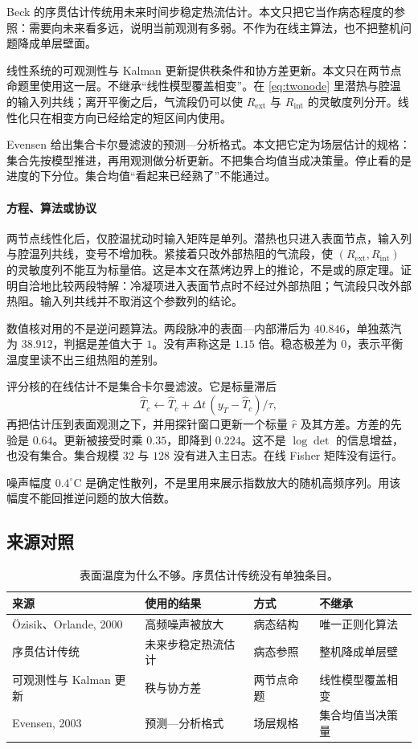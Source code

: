Beck 的序贯估计传统用未来时间步稳定热流估计。本文只把它当作病态程度的参照：需要向未来看多远，说明当前观测有多弱。不作为在线主算法，也不把整机问题降成单层壁面。

线性系统的可观测性与 Kalman 更新提供秩条件和协方差更新。本文只在两节点命题里使用这一层。不继承“线性模型覆盖相变”。在 \eqref{eq:twonode} 里潜热与腔温的输入列共线；离开平衡之后，气流段仍可以使 \(R_{\mathrm{ext}}\) 与 \(R_{\mathrm{int}}\) 的灵敏度列分开。线性化只在相变方向已经给定的短区间内使用。

Evensen 给出集合卡尔曼滤波的预测—分析格式\cite{evensen2003}。本文把它定为场层估计的规格：集合先按模型推进，再用观测做分析更新。不把集合均值当成决策量。停止看的是进度的下分位。集合均值“看起来已经熟了”不能通过。

\paragraph{方程、算法或协议}
两节点线性化后，仅腔温扰动时输入矩阵是单列。潜热也只进入表面节点，输入列与腔温列共线，变号不增加秩。紧接着只改外部热阻的气流段，使 $(R_{\mathrm{ext}},R_{\mathrm{int}})$ 的灵敏度列不能互为标量倍。这是本文在蒸烤边界上的推论，不是\cite{ozisik2000}或\cite{evensen2003}的原定理。证明自洽地比较两段特解：冷凝项进入表面节点时不经过外部热阻；气流段只改外部热阻。输入列共线并不取消这个参数列的结论。

数值核对用的不是逆问题算法。两段脉冲的表面—内部滞后为 $40.846$，单独蒸汽为 $38.912$，判据是差值大于 $1$。没有声称这是 $1.15$ 倍。稳态极差为 $0$，表示平衡温度里读不出三组热阻的差别。

评分核的在线估计不是集合卡尔曼滤波。它是标量滞后
\[
\widehat T_c\leftarrow\widehat T_c+\Delta t\,(y_T-\widehat T_c)/\tau,
\]
再把估计压到表面观测之下，并用探针窗口更新一个标量 $\hat r$ 及其方差。方差的先验是 $0.64$。更新被接受时乘 $0.35$，即降到 $0.224$。这不是 $\log\det$ 的信息增益，也没有集合。集合规模 $32$ 与 $128$ 没有进入主日志。在线 Fisher 矩阵没有运行。

噪声幅度 $0.4^\circ\mathrm{C}$ 是确定性散列，不是\cite{ozisik2000}里用来展示指数放大的随机高频序列。用该幅度不能回推逆问题的放大倍数。

\subsection{来源对照}
\begin{table}[ht]
\centering
\caption{表面温度为什么不够。序贯估计传统没有单独条目。}
\begin{tabularx}{\textwidth}{lXll}
\toprule
来源 & 使用的结果 & 方式 & 不继承 \\
\midrule
Özisik、Orlande, 2000 & 高频噪声被放大 & 病态结构 & 唯一正则化算法 \\
序贯估计传统 & 未来步稳定热流估计 & 病态参照 & 整机降成单层壁 \\
可观测性与 Kalman 更新 & 秩与协方差 & 两节点命题 & 线性模型覆盖相变 \\
Evensen, 2003 & 预测—分析格式 & 场层规格 & 集合均值当决策量 \\
\bottomrule
\end{tabularx}
\end{table}

